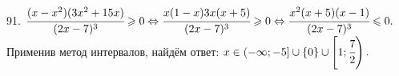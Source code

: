 91. $\cfrac{(x-x^2)(3x^2+15x)}{(2x-7)^3}\geqslant 0\Leftrightarrow
\cfrac{x(1-x)3x(x+5)}{(2x-7)^3}\geqslant0\Leftrightarrow
\cfrac{x^2(x+5)(x-1)}{(2x-7)^3}\leqslant0.$ Применив метод интервалов, найдём ответ: $x\in\left(-\infty;-5\right]\cup\{0\}\cup\left[1;\cfrac{7}{2}\right).$
\begin{figure}[ht!]
\end{figure}\\

